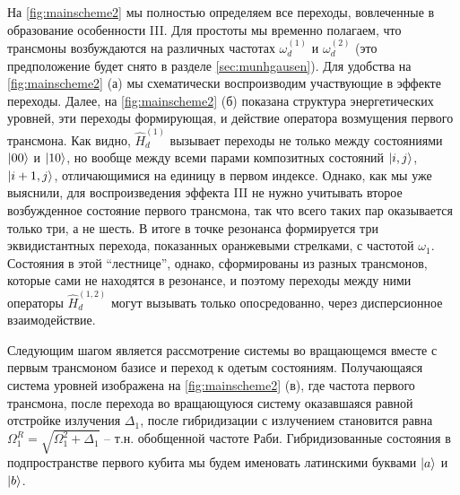 \documentclass[14pt, a4paper]{extreport}
\DeclarePairedDelimiter\ket{\lvert}{\rangle}
\numberwithin{equation}{section}
\begin{document}
На \autoref{fig:mainscheme2} мы полностью определяем все переходы, вовлеченные в образование особенности III. Для простоты мы временно полагаем, что трансмоны возбуждаются на различных частотах $\omega_d^{(1)}$  и $\omega_d^{(2)}$ (это предположение будет снято в разделе \ref{sec:munhgausen}). Для удобства на \autoref{fig:mainscheme2} (а) мы схематически воспроизводим участвующие в эффекте переходы. Далее, на \autoref{fig:mainscheme2} (б) показана структура энергетических уровней, эти переходы формирующая, и действие оператора возмущения первого трансмона. Как видно, $\hat H_d^{(1)}$ вызывает переходы не только между состояниями $\ket{00}$ и $\ket{10}$, но вообще между всеми парами композитных состояний $\ket{i, j}$, $\ket{i+1, j}$, отличающимися на единицу в первом индексе. Однако, как мы уже выяснили, для воспроизведения эффекта III не нужно учитывать второе возбужденное состояние первого трансмона, так что всего таких пар оказывается только три, а не шесть. В итоге в точке резонанса формируется три эквидистантных перехода, показанных оранжевыми стрелками, с частотой $\omega_1$. Состояния в этой ``лестнице'', однако, сформированы из разных трансмонов, которые сами не находятся в резонансе, и поэтому переходы между ними операторы $\hat H_d^{(1,2)}$ могут вызывать только опосредованно, через дисперсионное взаимодействие.

Следующим шагом является рассмотрение системы во вращающемся вместе с первым трансмоном базисе и переход к одетым состояниям. Получающаяся система уровней изображена на \autoref{fig:mainscheme2} (в), где частота первого трансмона, после перехода во вращающуюся систему оказавшаяся равной отстройке излучения $\Delta_1$, после гибридизации с излучением становится равна $\Omega_1^R = \sqrt{\Omega_1^2 + \Delta_1}$ -- т.н. обобщенной частоте Раби. Гибридизованные состояния в подпространстве первого кубита мы будем именовать латинскими буквами $\ket{a}$ и $\ket{b}$.
\end{document}

